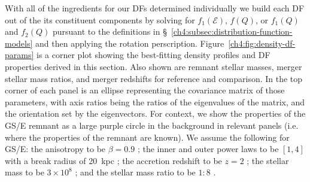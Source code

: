 With all of the ingredients for our DFs determined individually we build each DF out of the its constituent components by solving for $f_{1}(\mathcal{E})$, $f(Q)$, or $f_{1}(Q)$ and $f_{2}(Q)$ pursuant to the definitions in \S~\ref{ch4:subsec:distribution-function-models} and then applying the rotation perscription. Figure~\ref{ch4:fig:density-df-params} is a corner plot showing the best-fitting density profiles and DF properties derived in this section. Also shown are remnant stellar masses, merger stellar mass ratios, and merger redshifts for reference and comparison. In the top corner of each panel is an ellipse representing the covariance matrix of those parameters, with axis ratios being the ratios of the eigenvalues of the matrix, and the orientation set by the eigenvectors. For context, we show the properties of the GS/E remnant as a large purple circle in the background in relevant panels (i.e. where the properties of the remnant are known). We assume the following for GS/E: the anisotropy to be $\beta=0.9$ \parencite{belokurov18,lancaster19}; the inner and outer power laws to be $[1,4]$ with a break radius of 20~kpc \parencite[][]{han22,lane23}; the accretion redshift to be $z=2$ \parencite[see][]{mackereth19a,montalban21}; the stellar mass to be $3\times10^{8}$ \parencite[a value typical of recent findings;][]{mackereth20,han22,lane23}; and the stellar mass ratio to be $1:8$ \parencite{lane23}. 

